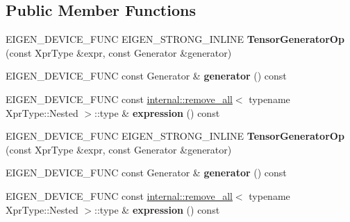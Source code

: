 \subsection*{Public Member Functions}
\begin{DoxyCompactItemize}
\item 
\mbox{\label{class_eigen_1_1_tensor_generator_op_a5d471c825da2af982e097dc5e49cdad9}} 
E\+I\+G\+E\+N\+\_\+\+D\+E\+V\+I\+C\+E\+\_\+\+F\+U\+NC E\+I\+G\+E\+N\+\_\+\+S\+T\+R\+O\+N\+G\+\_\+\+I\+N\+L\+I\+NE {\bfseries Tensor\+Generator\+Op} (const Xpr\+Type \&expr, const Generator \&generator)
\item 
\mbox{\label{class_eigen_1_1_tensor_generator_op_a0bedd4f9d15dc48f0dd724a74237f953}} 
E\+I\+G\+E\+N\+\_\+\+D\+E\+V\+I\+C\+E\+\_\+\+F\+U\+NC const Generator \& {\bfseries generator} () const
\item 
\mbox{\label{class_eigen_1_1_tensor_generator_op_a2e5ac654da1a67c12089edc1e3de0533}} 
E\+I\+G\+E\+N\+\_\+\+D\+E\+V\+I\+C\+E\+\_\+\+F\+U\+NC const \hyperlink{struct_eigen_1_1internal_1_1remove__all}{internal\+::remove\+\_\+all}$<$ typename Xpr\+Type\+::\+Nested $>$\+::type \& {\bfseries expression} () const
\item 
\mbox{\label{class_eigen_1_1_tensor_generator_op_a5d471c825da2af982e097dc5e49cdad9}} 
E\+I\+G\+E\+N\+\_\+\+D\+E\+V\+I\+C\+E\+\_\+\+F\+U\+NC E\+I\+G\+E\+N\+\_\+\+S\+T\+R\+O\+N\+G\+\_\+\+I\+N\+L\+I\+NE {\bfseries Tensor\+Generator\+Op} (const Xpr\+Type \&expr, const Generator \&generator)
\item 
\mbox{\label{class_eigen_1_1_tensor_generator_op_a0bedd4f9d15dc48f0dd724a74237f953}} 
E\+I\+G\+E\+N\+\_\+\+D\+E\+V\+I\+C\+E\+\_\+\+F\+U\+NC const Generator \& {\bfseries generator} () const
\item 
\mbox{\label{class_eigen_1_1_tensor_generator_op_a2e5ac654da1a67c12089edc1e3de0533}} 
E\+I\+G\+E\+N\+\_\+\+D\+E\+V\+I\+C\+E\+\_\+\+F\+U\+NC const \hyperlink{struct_eigen_1_1internal_1_1remove__all}{internal\+::remove\+\_\+all}$<$ typename Xpr\+Type\+::\+Nested $>$\+::type \& {\bfseries expression} () const
\end{DoxyCompactItemize}
